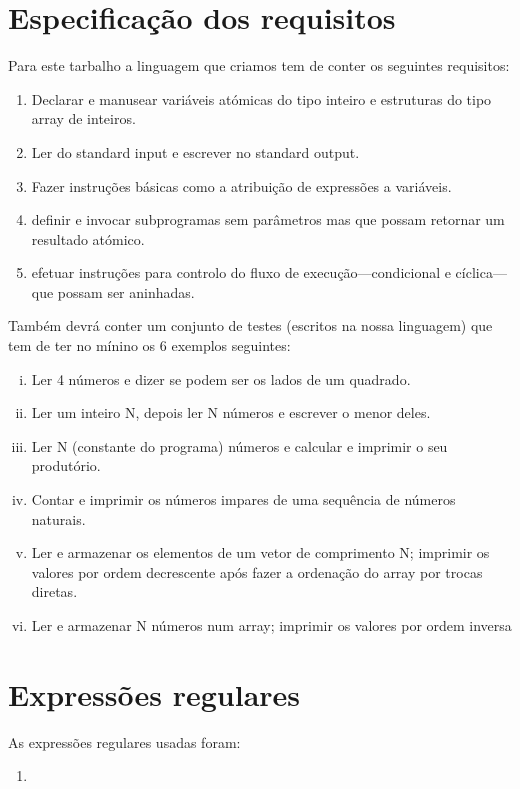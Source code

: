 \documentclass{report}
\begin{document}
\section{Especificação dos requisitos}
\indent
Para este tarbalho a linguagem que criamos tem de conter os seguintes requisitos:
\begin{enumerate}
	\item Declarar e manusear variáveis atómicas do tipo inteiro e estruturas do tipo array de inteiros.
	\item Ler do standard input e escrever no standard output.
	\item Fazer instruções básicas como a atribuição de expressões a variáveis.
	\item definir e invocar subprogramas sem parâmetros mas que possam retornar um resultado atómico.
	\item efetuar instruções para controlo do fluxo de execução—condicional e cíclica—que possam ser aninhadas.
\end{enumerate}
\indent
Também devrá conter um conjunto de testes (escritos na nossa linguagem) que tem de ter no mínino os 6 exemplos seguintes:
\begin{enumerate}[i)]
	\item Ler 4 números e dizer se podem ser os lados de um quadrado.
	\item Ler um inteiro N, depois ler N números e escrever o menor deles.
	\item Ler N (constante do programa) números e calcular e imprimir o seu produtório.
	\item Contar e imprimir os números impares de uma sequência de números naturais.
	\item Ler e armazenar os elementos de um vetor de comprimento N; imprimir os valores por ordem decrescente após
	fazer a ordenação do array por trocas diretas.
	\item Ler e armazenar N números num array; imprimir os valores por ordem inversa
\end{enumerate} 
\section{Expressões regulares} 
As expressões regulares usadas foram:

\begin{enumerate}[1)]
	\item

\end{enumerate}
\end{document}
